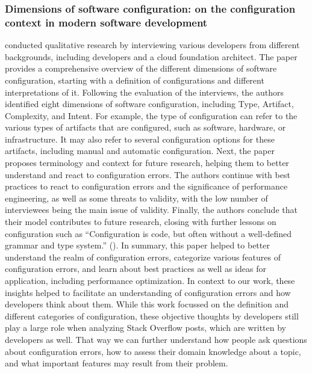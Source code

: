 \documentclass[english,bachelor]{swsLeipzig}
\begin{document}
\subsubsection{Dimensions of software configuration: on the configuration context in modern software development}
\citet{siegmund:2020} conducted qualitative research by interviewing various developers from different backgrounds, 
including developers and a cloud foundation architect. The paper provides a comprehensive overview of the different dimensions of software configuration, starting with a definition of configurations and different interpretations of it. Following the evaluation of the interviews, the authors identified eight dimensions of software configuration, including Type, Artifact, Complexity, and Intent. For example, the type of configuration can refer to the various types of artifacts that are configured, such as software, hardware, or infrastructure. It may also refer to several configuration options for these artifacts, including manual and automatic configuration. Next, the paper proposes terminology and context for future research, helping them to better understand and react to configuration errors. The authors continue with best practices to react to configuration errors and the significance of performance engineering, as well as some threats to validity, with the low number of interviewees being the main issue of validity. Finally, the authors conclude that their model contributes to future research, closing with further lessons on configuration such as ``Configuration is code, but often without a well-defined grammar and type system.'' (\citet{siegmund:2020}). In summary, this paper helped to better understand the realm of configuration errors, categorize various features of configuration errors, and learn about best practices as well as ideas for application, including performance optimization. In context to our work, these insights helped to facilitate an understanding of configuration errors and how developers think about them. While this work focussed on the definition and different categories of configuration, these objective thoughts by developers still play a large role when analyzing Stack Overflow posts, which are written by developers as well. That way we can further understand how people ask questions about configuration errors, how to assess their domain knowledge about a topic, and what important features may result from their problem.
\end{document}
